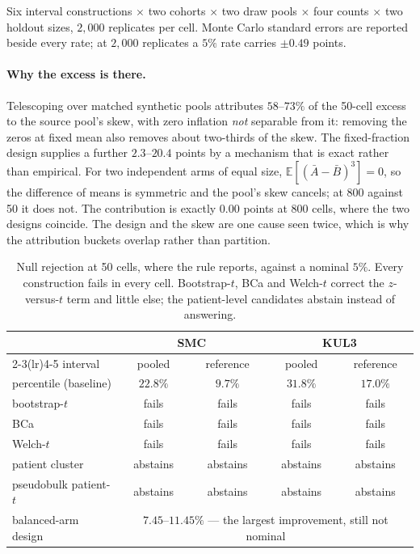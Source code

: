 Six interval constructions $\times$ two cohorts $\times$ two draw pools $\times$
four counts $\times$ two holdout sizes, $2{,}000$ replicates per cell.
Monte Carlo standard errors are reported beside every rate; at $2{,}000$
replicates a $5\%$ rate carries $\pm 0.49$ points.

\paragraph{Why the excess is there.} Telescoping over matched synthetic pools
attributes $58$--$73\%$ of the 50-cell excess to the source pool's skew, with
zero inflation \emph{not} separable from it: removing the zeros at fixed mean
also removes about two-thirds of the skew. The fixed-fraction design supplies a
further $2.3$--$20.4$ points by a mechanism that is exact rather than
empirical. For two independent arms of equal size,
$\mathbb{E}[(\bar A-\bar B)^3]=0$, so the difference of means is symmetric and
the pool's skew cancels; at 800 against 50 it does not. The contribution is
exactly $0.00$ points at 800 cells, where the two designs coincide. The design
and the skew are one cause seen twice, which is why the attribution buckets
overlap rather than partition.

\begin{table}[htbp]
\small
\centering
\caption{Null rejection at 50 cells, where the rule reports, against a nominal
$5\%$. Every construction fails in every cell. Bootstrap-$t$, BCa and Welch-$t$
correct the $z$-versus-$t$ term and little else; the patient-level candidates
abstain instead of answering.}
\label{tab:repair}
\begin{tabular}{@{}lcccc@{}}
\toprule
& \multicolumn{2}{c}{\textbf{SMC}} & \multicolumn{2}{c}{\textbf{KUL3}} \\
\cmidrule(lr){2-3}\cmidrule(lr){4-5}
interval & pooled & reference & pooled & reference \\
\midrule
percentile (baseline) & $22.8\%$ & $9.7\%$ & $31.8\%$ & $17.0\%$ \\
bootstrap-$t$         & fails    & fails    & fails    & fails \\
BCa                   & fails    & fails    & fails    & fails \\
Welch-$t$             & fails    & fails    & fails    & fails \\
patient cluster       & abstains & abstains & abstains & abstains \\
pseudobulk patient-$t$& abstains & abstains & abstains & abstains \\
\midrule
balanced-arm design   & \multicolumn{4}{c}{$7.45$--$11.45\%$ --- the largest improvement, still not nominal} \\
\bottomrule
\end{tabular}
\end{table}

